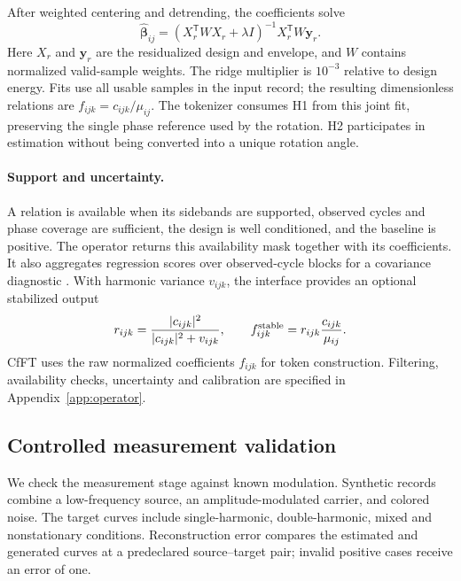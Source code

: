 \documentclass[10pt,twocolumn,letterpaper]{article}
\begin{document}
After weighted centering and detrending, the coefficients solve
\begin{equation}
\widehat{\boldsymbol\beta}_{ij}
 =(X_r^{\mathsf T}WX_r+\lambda I)^{-1}
   X_r^{\mathsf T}W\mathbf y_r.
\label{eq:pac-fit}
\end{equation}
Here $X_r$ and $\mathbf y_r$ are the residualized design and envelope,
and $W$ contains normalized valid-sample weights. The ridge multiplier
is $10^{-3}$ relative to design energy. Fits use
all usable samples in the input record; the resulting dimensionless
relations are $f_{ijk}=c_{ijk}/\mu_{ij}$. The tokenizer consumes H1 from
this joint fit, preserving the single phase reference used by the
rotation. H2 participates in estimation without being converted into
a unique rotation angle.

\paragraph{Support and uncertainty.}
A relation is available when its sidebands are supported, observed
cycles and phase coverage are sufficient, the design is well
conditioned, and the baseline is positive. The operator returns this
availability mask together with its coefficients. It also aggregates
regression scores over observed-cycle blocks for a covariance diagnostic
\citep{cameron2015cluster}. With harmonic variance $v_{ijk}$, the
interface provides an optional stabilized output
\begin{equation}
r_{ijk}=\frac{|c_{ijk}|^2}{|c_{ijk}|^2+v_{ijk}},\qquad
f_{ijk}^{\rm stable}=r_{ijk}\frac{c_{ijk}}{\mu_{ij}}.
\label{eq:pac-stable}
\end{equation}
CfFT uses the raw normalized coefficients $f_{ijk}$ for token construction.
Filtering, availability checks, uncertainty and calibration are specified
in Appendix~\ref{app:operator}.

\subsection{Controlled measurement validation}
\label{sec:synthetic}
We check the measurement stage against known modulation. Synthetic
records combine a low-frequency source, an amplitude-modulated carrier,
and colored noise. The target curves include single-harmonic,
double-harmonic, mixed and nonstationary conditions. Reconstruction
error compares the estimated and generated curves at a predeclared
source--target pair; invalid positive cases receive an error of one.
\end{document}
